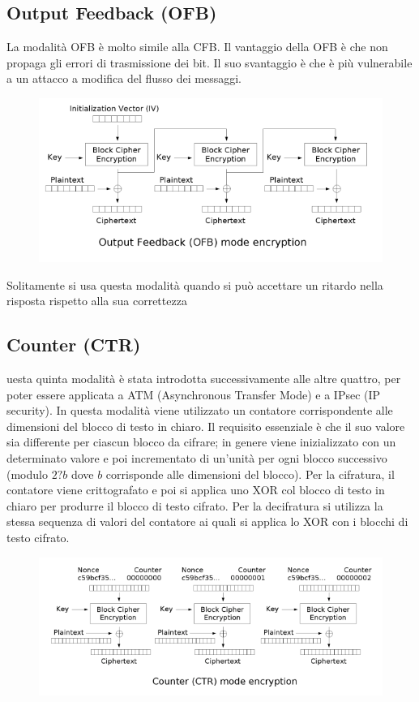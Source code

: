 \documentclass[10pt,a4paper]{article}
\begin{document}
\subsection{Output Feedback (OFB)}
La modalità OFB è molto simile alla CFB. Il vantaggio della OFB è che non propaga gli errori di trasmissione dei bit. Il suo svantaggio è che è più vulnerabile a un attacco a modifica del flusso dei messaggi.

\begin{figure}[htbp]
\includegraphics[scale=0.8]{immagini/ofb.png}
\end{figure}

Solitamente si usa questa modalità quando si può accettare un ritardo nella risposta rispetto alla sua correttezza

\subsection{Counter (CTR)}
uesta quinta modalità è stata introdotta successivamente alle altre quattro, per poter essere applicata a ATM (Asynchronous Transfer Mode) e a IPsec (IP security).
In questa modalità viene utilizzato un contatore corrispondente alle dimensioni del blocco di testo in chiaro. Il requisito essenziale è che il suo valore sia differente per ciascun blocco da cifrare; in genere viene inizializzato con un determinato valore e poi incrementato di un'unità per ogni blocco successivo (modulo $2?b$ dove $b$ corrisponde alle dimensioni del blocco).
Per la cifratura, il contatore viene crittografato e poi si applica uno XOR col blocco di testo in chiaro per produrre il blocco di testo cifrato.
Per la decifratura si utilizza la stessa sequenza di valori del contatore ai quali si applica lo XOR con i blocchi di testo cifrato.

\begin{figure}[htbp]
\includegraphics[scale=0.8]{immagini/ctr.png}
\end{figure}
\end{document}
